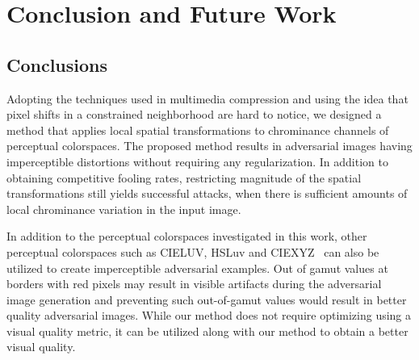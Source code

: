 \chapter{Conclusion and Future Work}
\section{Conclusions}
Adopting the techniques used in multimedia compression and using the idea that pixel shifts in a constrained neighborhood are hard to notice, we designed a method that applies local spatial transformations to chrominance channels of perceptual colorspaces. The proposed method results in adversarial images having imperceptible distortions without requiring any regularization. In addition to obtaining competitive fooling rates, restricting magnitude of the spatial transformations still yields successful attacks, when there is sufficient amounts of local chrominance variation in the input image.

In addition to the perceptual colorspaces investigated in this work, other perceptual colorspaces such as CIELUV, HSLuv and CIEXYZ~\cite{schanda2007colorimetry} can also be utilized to create imperceptible adversarial examples. Out of gamut values at borders with red pixels may result in visible artifacts during the adversarial image generation and preventing such out-of-gamut values would result in better quality adversarial images.  %
While our method does not require optimizing using a visual quality metric, it can be utilized along with our method to obtain a better visual quality.
\label{chp:b7}
